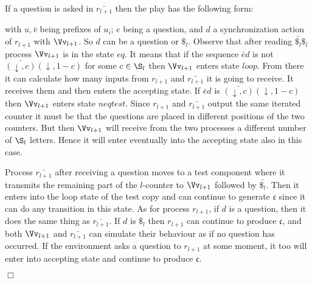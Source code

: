 \documentclass{llncs}
\newcommand{\rlp}{r_{l+1}}
\newcommand{\brlp}{\bar{\rlp}}
\newcommand{\cc}{\mathfrak{c}}
\newcommand{\dar}{\downarrow}
\renewenvironment{proof}{{\em Proof. }}{\nopagebreak
  \hspace*{\fill}$\Box$}
\begin{document}
\begin{proof}
  If a question is asked in $\bar{r_{l+1}}$ then the play has the
  following form:
  \begin{center}
  \end{center}
  \noindent with $u,\bar v$ being prefixes of $u_i$; $e$ being a
  question, and $d$ a synchronization action of $\rlp$ with $\Vv_{l+1}$. So
  $d$ can be a question or $\$_l$. Observe that after reading
  $\bar{\$_l}\$_l$ process $\Vv_{l+1}$ is in the state $\mathit{eq}$. It means that if
  the sequence $\bar e d$ is not $\bar{(\dar,c)}(\dar,1-c)$ for some
  $c\in\S_l$ then $\Vv_{l+1}$ enters state $\mathit{loop}$. From there it can
  calculate how many inputs from $r_{l+1}$ and $\bar{r_{l+1}}$ it is
  going to receive. It receives them and then enters the accepting
  state.  If $\bar e d$ is $\bar{(\dar,c)}(\dar,1-c)$ then $\Vv_{l+1}$ enters
  state $\mathit{neqtest}$. Since $\rlp$ and $\brlp$ output the same iterated
  counter it must be that the questions are placed in different
  positions of the two counters. But then $\Vv_{l+1}$ will receive from the
  two processes a different number of $\S_l$ letters. Hence it will
  enter eventually into the accepting state also in this case.

  Process $\brlp$ after receiving a question moves to a test component
  where it transmits the remaining part of the $l$-counter to $\Vv_{l+1}$
  followed by $\bar{\$_l}$. Then it enters into the loop state of the
  test copy and can continue to generate $\cc$ since it can do any
  transition in this state. As for process $\rlp$, if $d$ is a
  question, then it does the same thing as $\brlp$.  If $d$ is $\$_l$
  then $\rlp$ can continue to produce $\cc$, and both $\Vv_{l+1}$ and $\brlp$
  can simulate their behaviour as if no question has occurred. If the
  environment asks a question to $\rlp$ at some moment, it too will
  enter into accepting state and continue to produce $\cc$.


\end{proof}
\end{document}
